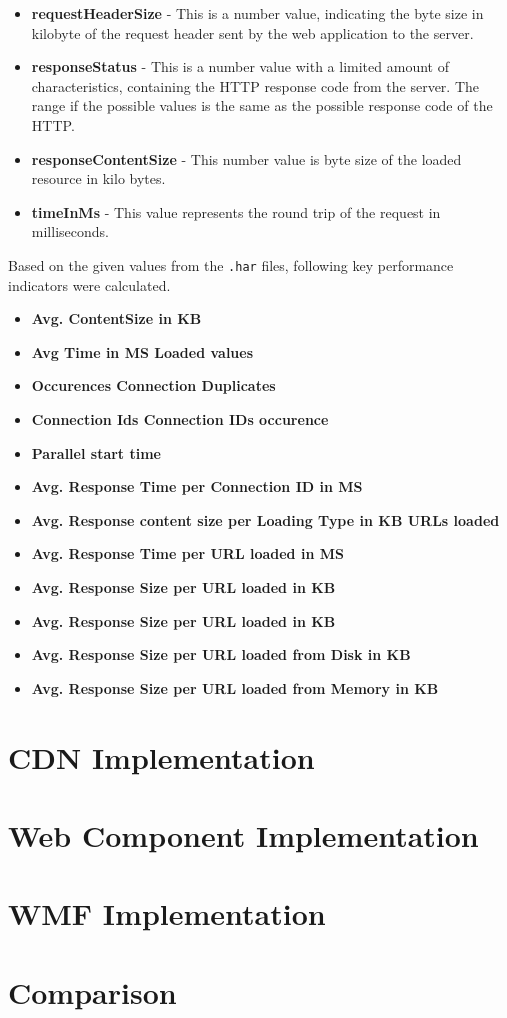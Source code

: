 \begin{itemize}
	\item \textbf{requestHeaderSize}	- This is a number value, indicating the byte size in kilobyte of the request header sent by the web application to the server.
	
	\item \textbf{responseStatus} - This is a number value with a limited amount of characteristics, containing the HTTP response code from the server. The range if the possible values is the same as the possible response code of the HTTP.
	
	\item \textbf{responseContentSize} - This number value is byte size of the loaded resource in kilo bytes.
	
	\item \textbf{timeInMs} - This value represents the round trip of the request in milliseconds. 
\end{itemize}

Based on the given values from the \texttt{.har} files, following key performance indicators were calculated.

\begin{itemize}
	\item \textbf{Avg. ContentSize in KB} 
	\item \textbf{Avg Time in MS Loaded values}
	\item \textbf{Occurences Connection Duplicates}
	\item \textbf{Connection Ids Connection IDs occurence}
	\item \textbf{Parallel start time}
	\item \textbf{Avg. Response Time per Connection ID in MS}
	\item \textbf{Avg. Response content size per Loading Type in KB	URLs loaded}
	\item \textbf{Avg. Response Time per URL loaded in MS}
	\item \textbf{Avg. Response Size per URL loaded in KB}
	\item \textbf{Avg. Response Size per URL loaded in KB}
	\item \textbf{Avg. Response Size per URL loaded from Disk in KB}
	\item \textbf{Avg. Response Size per URL loaded from Memory in KB}
\end{itemize}

\section{CDN Implementation}

\section{Web Component Implementation}

\section{WMF Implementation}

\section{Comparison}



